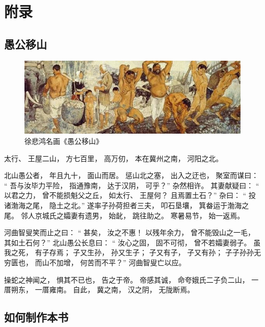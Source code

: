 \documentclass[doctor,openright,twoside]{sjtuthesis}
\makeatletter
\theoremstyle{plain}
\theoremstyle{definition}
\theoremstyle{remark}
\theoremstyle{ocrenumbox}
\theoremstyle{plain}
\newcommand\writeby[1]{\rightline{------ #1}}
\newcommand*\Tiangan[1]{\csname tiangan\romannumeral\value{#1}\endcsname}
\let\oldappendix\appendix
\renewcommand\appendix{%
  \oldappendix
  \renewcommand{\CTEX@prechapter}{附录}
  \renewcommand{\CTEX@thechapter}{\Tiangan{chapter}}
  \renewcommand{\thechapter}{\Tiangan{chapter}}
}
\makeatother
\begin{document}
\hypertarget{part:others}{%
\part{附录}\label{part:others}}

\hypertarget{chap:appendix}{%
\appendix}


\hypertarget{chap:yugong}{%
\chapter{\texorpdfstring{愚公移山}{愚公移山}}\label{chap:yugong}}

\writeby{先秦 \quad 列御寇}

\begin{figure}
\centering
\includegraphics{images/yugongyishan.jpg}
\caption{徐悲鸿名画《愚公移山》}
\end{figure}

太行、 王屋二山， 方七百里， 高万仞， 本在冀州之南， 河阳之北。

北山愚公者， 年且九十， 面山而居。 惩山北之塞， 出入之迂也， 聚室而谋曰： `` 吾与汝毕力平险， 指通豫南， 达于汉阴， 可乎？'' 杂然相许。 其妻献疑曰： `` 以君之力， 曾不能损魁父之丘， 如太行、 王屋何？ 且焉置土石？'' 杂曰： `` 投诸渤海之尾， 隐土之北。'' 遂率子孙荷担者三夫， 叩石垦壤， 箕畚运于渤海之尾。 邻人京城氏之孀妻有遗男， 始龀， 跳往助之。 寒暑易节， 始一返焉。

河曲智叟笑而止之曰： `` 甚矣， 汝之不惠！ 以残年余力， 曾不能毁山之一毛， 其如土石何？'' 北山愚公长息曰： `` 汝心之固， 固不可彻， 曾不若孀妻弱子。 虽我之死， 有子存焉； 子又生孙， 孙又生子； 子又有子， 子又有孙； 子子孙孙无穷匮也， 而山不加增， 何苦而不平？'' 河曲智叟亡以应。

操蛇之神闻之， 惧其不已也， 告之于帝。 帝感其诚， 命夸娥氏二子负二山， 一厝朔东， 一厝雍南。 自此， 冀之南， 汉之阴， 无陇断焉。

\hypertarget{chap:makebook}{%
\chapter{如何制作本书}\label{chap:makebook}}
\end{document}

